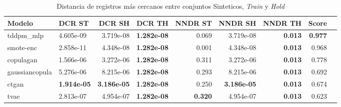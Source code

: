 \begin{table}[H]
\centering
\caption{Distancia de registros más cercanos entre conjuntos Sinteticos, \emph{Train} y \emph{Hold}}
\label{table-dcr-economicos-a-1}
\begin{tabular}{|l|l|r|r|r|r|r|r|r|}
\hline
\rowcolor[gray]{0.8}
Modelo & DCR ST & DCR SH & DCR TH & NNDR ST & NNDR SH & NNDR TH & \textbf{Score} \\
\hline tddpm\_mlp & 4.605e-09 & \cellcolor[rgb]{0.9, 0.54, 0.52} 3.719e-08 & \bfseries 1.282e-08 & 0.069 & 3.719e-08 & \bfseries 0.013 & \bfseries 0.977 \\
\hline smote-enc & \cellcolor[rgb]{0.9, 0.54, 0.52} 2.858e-11 & 4.348e-08 & \bfseries 1.282e-08 & 0.001 & 4.348e-08 & \bfseries 0.013 & 0.968 \\
\hline copulagan & 1.566e-06 & 3.272e-06 & \bfseries 1.282e-08 & 0.311 & 3.272e-06 & \bfseries 0.013 & 0.778 \\
\hline gaussiancopula & 5.276e-06 & 8.215e-06 & \bfseries 1.282e-08 & 0.293 & 8.215e-06 & \bfseries 0.013 & 0.692 \\
\hline ctgan & \bfseries 1.914e-05 & \bfseries 3.186e-05 & \bfseries 1.282e-08 & 0.250 & \bfseries 3.186e-05 & \bfseries 0.013 & 0.674 \\
\hline tvae & 2.813e-07 & 4.954e-07 & \bfseries 1.282e-08 & \bfseries 0.320 & 4.954e-07 & \bfseries 0.013 & 0.623 \\
\hline
\end{tabular}
\end{table}
